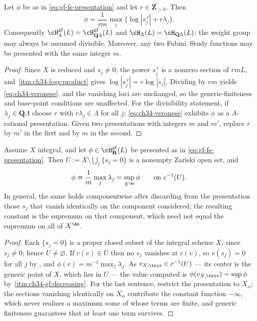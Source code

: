 \begin{lemma}
\label{lem:ch34-veronese}
Let $\phi$ be as in \eqref{eq:gf-fs-presentation} and let
$r\in\mathbf Z_{>0}$.  Then
\begin{equation}
\label{eq:ch34-veronese}
 \phi=\frac1{rm}\max_j\{\log|s_j^{\,r}|+r\lambda_j\}.
\end{equation}
Consequently
$\cH^{\mathrm{gf}}_\Lambda(L)=\cH^{\mathrm{gf}}_{\mathbf Q\Lambda}(L)$ and
$\cH_\Lambda(L)=\cH_{\mathbf Q\Lambda}(L)$: the weight group may always be
assumed divisible.  Moreover, any two Fubini--Study functions may be
presented with the same integer $m$.
\end{lemma}

\begin{proof}
Since $X$ is reduced and $s_j\ne0$, the power $s_j^{\,r}$ is a nonzero
section of $rmL$, and
\,\cref{itm:ch34-logs:product} gives
$\log|s_j^{\,r}|=r\log|s_j|$.  Dividing by $rm$ yields
\eqref{eq:ch34-veronese}, and the vanishing loci are unchanged, so the
generic-finiteness and base-point conditions are unaffected.  For the
divisibility statement, if $\lambda_j\in\mathbf Q\Lambda$ choose $r$
with $r\lambda_j\in\Lambda$ for all $j$; \eqref{eq:ch34-veronese}
exhibits $\phi$ as a $\Lambda$-rational presentation.  Given two
presentations with integers $m$ and $m'$, replace $r$ by $m'$ in the
first and by $m$ in the second.
\end{proof}

\begin{lemma}
\label{lem:ch34-generic-constancy}
Assume $X$ integral, and let $\phi\in\cH^{\mathrm{gf}}_{\mathbf R}(L)$
be presented as in \eqref{eq:gf-fs-presentation}.  Then
$U:=X\setminus\bigcup_j\{s_j=0\}$ is a nonempty Zariski open set, and
\begin{equation}
\label{eq:ch34-generic-constancy}
 \phi\equiv\frac1m\max_j\lambda_j=\sup_{X^{\An}}\phi
 \qquad\text{on }c^{-1}(U).
\end{equation}
In general, the same holds componentwise after discarding from the
presentation those $s_j$ that vanish identically on the component
considered; the resulting constant is the supremum on that component,
which need not equal the supremum on all of $X^{\An}$.
\end{lemma}

\begin{proof}
Each $\{s_j=0\}$ is a proper closed subset of the integral scheme $X$,
since $s_j\ne0$; hence $U\ne\varnothing$.  If $c(v)\in U$ then no
$s_j$ vanishes at $c(v)$, so $v(s_j)=0$ for all $j$ by
, and
$\phi(v)=m^{-1}\max_j\lambda_j$.  As
$v_{X,\triv}\in c^{-1}(U)$ --- its center is the generic point of $X$,
which lies in $U$ --- the value computed is
$\phi(v_{X,\triv})=\sup\phi$ by
\,\cref{itm:ch34-gf:decreasing}.
For the last sentence, restrict the presentation to $X_\alpha$; the
sections vanishing identically on $X_\alpha$ contribute the constant
function $-\infty$, which never realizes a maximum some of whose terms are
finite, and generic finiteness guarantees that at least one term survives.
\end{proof}

